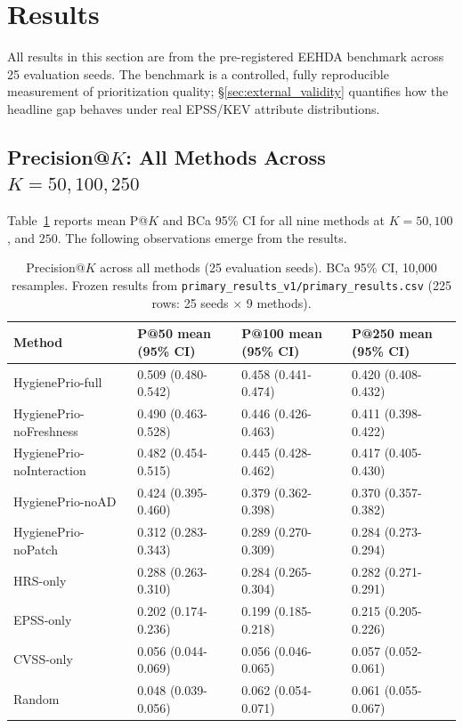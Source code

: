 \section{Results}
\label{sec:results}

All results in this section are from the pre-registered EEHDA benchmark across 25 evaluation seeds. The benchmark is a controlled, fully reproducible measurement of prioritization quality; \S\ref{sec:external_validity} quantifies how the headline gap behaves under real EPSS/KEV attribute distributions.

\subsection{Precision@$K$: All Methods Across $K = 50, 100, 250$}

Table~\ref{tab:precision_k} reports mean P@$K$ and BCa 95\% CI for all nine methods at $K = 50, 100$, and $250$. The following observations emerge from the results.

\begin{table}[!t]
 \caption{Precision@$K$ across all methods (25 evaluation seeds). BCa 95\% CI, 10,000 resamples. Frozen results from \texttt{primary\_results\_v1/\allowbreak primary\_results.csv} (225 rows: 25 seeds $\times$ 9 methods).}
 \label{tab:precision_k}
 \centering
 \begin{tabular}{llll}
 \toprule
 \textbf{Method} & \textbf{P@50 mean (95\% CI)} & \textbf{P@100 mean (95\% CI)} & \textbf{P@250 mean (95\% CI)} \\
 \midrule
 HygienePrio-full & 0.509 (0.480-0.542) & 0.458 (0.441-0.474) & 0.420 (0.408-0.432) \\
 HygienePrio-noFreshness & 0.490 (0.463-0.528) & 0.446 (0.426-0.463) & 0.411 (0.398-0.422) \\
 HygienePrio-noInteraction & 0.482 (0.454-0.515) & 0.445 (0.428-0.462) & 0.417 (0.405-0.430) \\
 HygienePrio-noAD & 0.424 (0.395-0.460) & 0.379 (0.362-0.398) & 0.370 (0.357-0.382) \\
 HygienePrio-noPatch & 0.312 (0.283-0.343) & 0.289 (0.270-0.309) & 0.284 (0.273-0.294) \\
 HRS-only & 0.288 (0.263-0.310) & 0.284 (0.265-0.304) & 0.282 (0.271-0.291) \\
 EPSS-only & 0.202 (0.174-0.236) & 0.199 (0.185-0.218) & 0.215 (0.205-0.226) \\
 CVSS-only & 0.056 (0.044-0.069) & 0.056 (0.046-0.065) & 0.057 (0.052-0.061) \\
 Random & 0.048 (0.039-0.056) & 0.062 (0.054-0.071) & 0.061 (0.055-0.067) \\
 \bottomrule
 \end{tabular}
\end{table}

